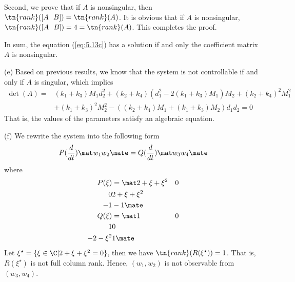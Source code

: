 Second, we prove that if $A$ is nonsingular, then $\tn{rank}([A ~~B]) = \tn{rank}(A)$. It is obvious that if $A$ is nonsingular, $\tn{rank}([A ~~B]) = 4 = \tn{rank}(A)$. This completes the proof.

In sum, the equation (\ref{eq:5.13c}) has a solution if and only the coefficient matrix $A$ is nonsingular.

(e) Based on previous results, we know that the system is not controllable if and only if $A$ is singular, which implies
\begin{align}
    \det{(A)} = &(k_1+k_3)M_1d_2^2 + (k_2+k_4)(d_1^2-2(k_1+k_3)M_1)M_2 + (k_2+k_4)^2M_1^2 \\
     &+ (k_1 + k_3)^2M_2^2 - ((k_2+k_4)M_1+(k_1+k_3)M_2)d_1d_2 = 0
\end{align}
That is, the values of the parameters satisfy an algebraic equation.

(f) We rewrite the system into the following form
\begin{equation}
    P(\frac{d}{dt})\mat w_1 \\ w_2 \mate = Q(\frac{d}{dt})\mat w_3 \\ w_4 \mate
\end{equation}
where
\begin{align}
    P(\xi) &= \mat 2+\xi+\xi^2 &0 \\ 0 &2+\xi+\xi^2 \\ -1 & -1 \mate \\
    Q(\xi) &= \mat 1 &0 \\ 1 &0 \\ -2-\xi^2 &1 \mate
\end{align}
Let $\xi^\star = \{\xi\in\C | 2+\xi+\xi^2=0\}$, then we have $\tn{rank}(R(\xi^\star)) = 1$. That is, $R(\xi^\star)$ is not full column rank. Hence, $(w_1,w_2)$ is not observable from $(w_3,w_4)$.



